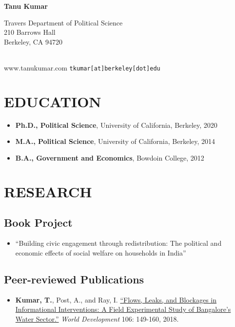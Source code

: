 \documentclass[11pt]{article}
\begin{document}
\thispagestyle{empty}
\begin{center}
\textbf{\Huge{Tanu Kumar}}
\end{center}

\begin{minipage}[t]{0.5\textwidth}
Travers Department of Political Science\\
210 Barrows Hall\\
Berkeley, CA 94720\\ \\
\end{minipage}
\begin{minipage}[t]{0.5\textwidth}
\begin{flushright}
www.tanukumar.com
\texttt{tkumar[at]berkeley[dot]edu}
\end{flushright}\end{minipage}
\section*{EDUCATION}

	\begin{itemize}[nosep]
		\item[] \textbf{Ph.D., Political Science}, University of California, Berkeley, 2020


	\item[]  \textbf{M.A., Political Science}, University of California, Berkeley, 2014
	\item[] \textbf{B.A., Government and Economics}, Bowdoin College, 2012

\end{itemize}	
\vspace{3mm}
\section*{RESEARCH}
\subsection*{Book Project}
\begin{itemize}
	\item[] ``Building civic engagement through redistribution: The political and economic effects of social welfare on households in India'' 
\end{itemize}


\subsection*{Peer-reviewed Publications}
\begin{itemize}
		\item[] \textbf{Kumar, T.}, Post, A., and Ray, I. \href{https://www.sciencedirect.com/science/article/pii/S0305750X18300329}{``Flows, Leaks, and Blockages in Informational Interventions: A Field Experimental Study of Bangalore's Water Sector.''} \textit{World Development} 106: 149-160, 2018.
\end{itemize}
\end{document}
